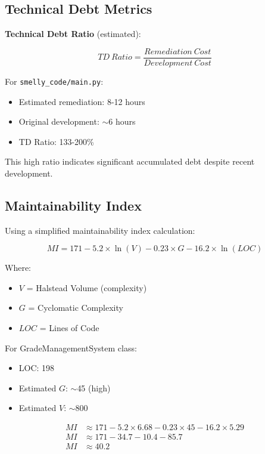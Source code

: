 \documentclass[11pt,a4paper]{article}
\begin{document}
\subsection{Technical Debt Metrics}

\textbf{Technical Debt Ratio} (estimated):

\begin{equation}
TD~Ratio = \frac{Remediation~Cost}{Development~Cost}
\end{equation}

For \texttt{smelly\_code/main.py}:
\begin{itemize}[noitemsep]
    \item Estimated remediation: 8-12 hours
    \item Original development: $\sim$6 hours
    \item TD Ratio: 133-200\%
\end{itemize}

This high ratio indicates significant accumulated debt despite recent development.

\subsection{Maintainability Index}

Using a simplified maintainability index calculation:

\begin{equation}
MI = 171 - 5.2 \times \ln(V) - 0.23 \times G - 16.2 \times \ln(LOC)
\end{equation}

Where:
\begin{itemize}[noitemsep]
    \item $V$ = Halstead Volume (complexity)
    \item $G$ = Cyclomatic Complexity
    \item $LOC$ = Lines of Code
\end{itemize}

For GradeManagementSystem class:
\begin{itemize}[noitemsep]
    \item LOC: 198
    \item Estimated $G$: $\sim$45 (high)
    \item Estimated $V$: $\sim$800
\end{itemize}

\begin{align*}
MI &\approx 171 - 5.2 \times 6.68 - 0.23 \times 45 - 16.2 \times 5.29 \\
MI &\approx 171 - 34.7 - 10.4 - 85.7 \\
MI &\approx 40.2
\end{align*}
\end{document}
